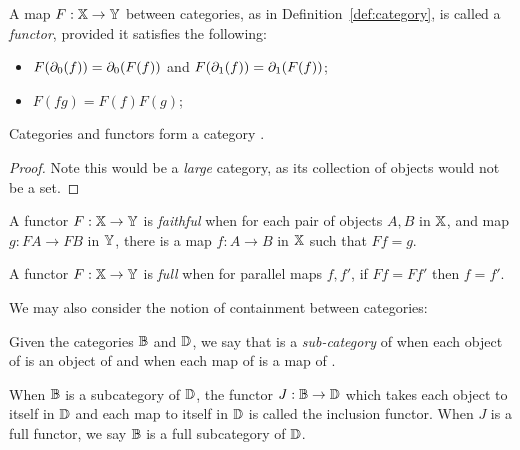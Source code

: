 \begin{definition}\label{def:functor}
  A map $F:\mathbb{X} \to \mathbb{Y}$ between categories, as in Definition~\ref{def:category}, is called a
  \emph{functor}, provided it satisfies the following:
  \begin{itemize}
    \item[\axiom{F}{1}] $F(\partial_0(f)) = \partial_0(F(f))$ and $F(\partial_1(f)) = \partial_1(F(f))$;
    \item[\axiom{F}{2}] $F(f g) = F(f)F(g)$;
  \end{itemize}
\end{definition}

\begin{lemma}\label{lem:cat_is_a_category}
  Categories and functors form a category \cat.
\end{lemma}
\begin{proof}
  \prepprooflist
  Note this would be a \emph{large} category, as its collection of objects would not be a set.
\end{proof}

\begin{definition}\label{def:faithful_functor}
  A functor $F:\mathbb{X}\to\mathbb{Y}$ is \emph{faithful} when for each pair of objects $A,B$ in $\mathbb{X}$, and map
  $g:FA \to FB$ in $\mathbb{Y}$, there is a map $f:A\to B$ in $\mathbb{X}$ such that $F f = g$.
\end{definition}

\begin{definition}\label{def:full_functor}
  A functor $F:\mathbb{X}\to\mathbb{Y}$ is \emph{full} when for parallel maps $f, f'$, if $Ff = Ff'$ then $f = f'$.
\end{definition}
We may also consider the notion of containment between categories:

\begin{definition}\label{def:subcategories}
  Given the categories $\mathbb{B}$ and $\mathbb{D}$, we say that \B is a \emph{sub-category} of \D when each object
  of \B is an object of \D and when each map of \B is a map of \D.
\end{definition}

When $\mathbb{B}$ is a subcategory of $\mathbb{D}$, the functor $J:\mathbb{B} \to \mathbb{D}$ which takes each object to itself in
$\mathbb{D}$ and each map to itself in $\mathbb{D}$ is called the inclusion functor. When $J$ is a full functor, we
say $\mathbb{B}$ is a full subcategory of $\mathbb{D}$.

